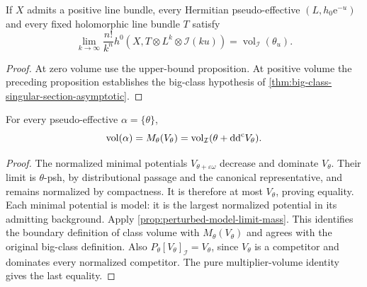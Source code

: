 \begin{corollary}\label{cor:projective-psh-metric-section-asymptotic}
If $X$ admits a positive line bundle, every Hermitian pseudo-effective $(L,h_0\mathrm e^{-u})$ and every fixed holomorphic line bundle $T$ satisfy
\[
 \lim_{k\to\infty}\frac{n!}{k^n}
 h^0(X,T\otimes L^k\otimes\mathcal I(ku))
       =\operatorname{vol}_{\mathcal I}(\theta_u).
\]
\end{corollary}
\begin{proof}
At zero volume use the upper-bound proposition. At positive volume the preceding proposition establishes the big-class hypothesis of \cref{thm:big-class-singular-section-asymptotic}.
\end{proof}

\begin{lemma}\label{lem:minimal-boundary-volume-attainment}
For every pseudo-effective $\alpha=\{\theta\}$,
\[
 \operatorname{vol}(\alpha)=M_\theta(V_\theta)
   =\operatorname{vol}_{\mathcal I}(\theta+\mathrm{dd}^{\mathrm{c}} V_\theta).
\]
\end{lemma}
\begin{proof}
The normalized minimal potentials $V_{\theta+\varepsilon\omega}$ decrease and dominate $V_\theta$. Their limit is $\theta$-psh, by distributional passage and the canonical representative, and remains normalized by compactness. It is therefore at most $V_\theta$, proving equality. Each minimal potential is model: it is the largest normalized potential in its admitting background. Apply \cref{prop:perturbed-model-limit-mass}. This identifies the boundary definition of class volume with $M_\theta(V_\theta)$ and agrees with the original big-class definition. Also $P_\theta[V_\theta]_{\mathcal I}=V_\theta$, since $V_\theta$ is a competitor and dominates every normalized competitor. The pure multiplier-volume identity gives the last equality.
\end{proof}

